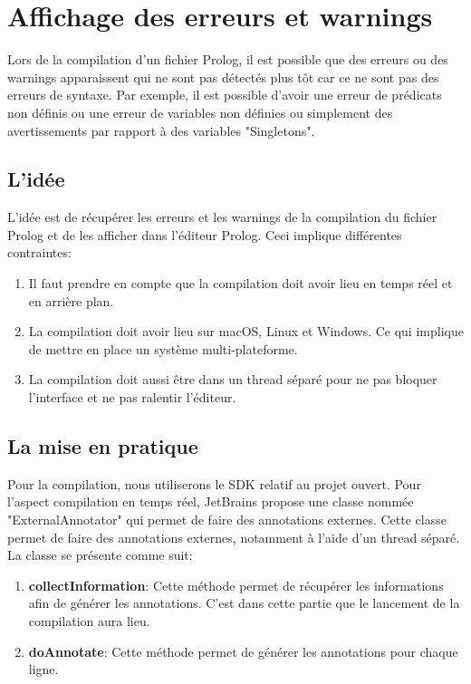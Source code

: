 \section{Affichage des erreurs et warnings}
\noindent Lors de la compilation d'un fichier Prolog, il est possible que des erreurs ou des warnings apparaissent
qui ne sont pas détectés plus tôt car ce ne sont pas des erreurs de syntaxe.
\newdoubleline
Par exemple, il est possible d'avoir une erreur de prédicats non définis ou une erreur de variables non définies ou simplement des avertissements par rapport à des variables "Singletons".

\subsection{L'idée}
\noindent L'idée est de récupérer les erreurs et les warnings de la compilation du fichier Prolog et de les afficher dans l'éditeur Prolog.
\newdoubleline
Ceci implique différentes contraintes:
\begin{enumerate}
    \item Il faut prendre en compte que la compilation doit avoir lieu en temps réel et en arrière plan.
    \item La compilation doit avoir lieu sur macOS, Linux et Windows.
    Ce qui implique de mettre en place un système multi-plateforme.
    \item La compilation doit aussi être dans un thread séparé pour ne pas bloquer l'interface et ne pas ralentir l'éditeur.
\end{enumerate}

\subsection{La mise en pratique}
\noindent Pour la compilation, nous utiliserons le SDK relatif au projet ouvert.
\newdoubleline
Pour l'aspect compilation en temps réel, JetBrains propose une classe nommée "ExternalAnnotator" qui permet de faire des annotations externes.
\newdoubleline
Cette classe permet de faire des annotations externes, notamment à l'aide d'un thread séparé. La classe se présente comme suit:
\begin{enumerate}
    \item \textbf{collectInformation}: Cette méthode permet de récupérer les informations afin de générer les annotations.
    C'est dans cette partie que le lancement de la compilation aura lieu.
    \item \textbf{doAnnotate}: Cette méthode permet de générer les annotations pour chaque ligne.
\end{enumerate}

